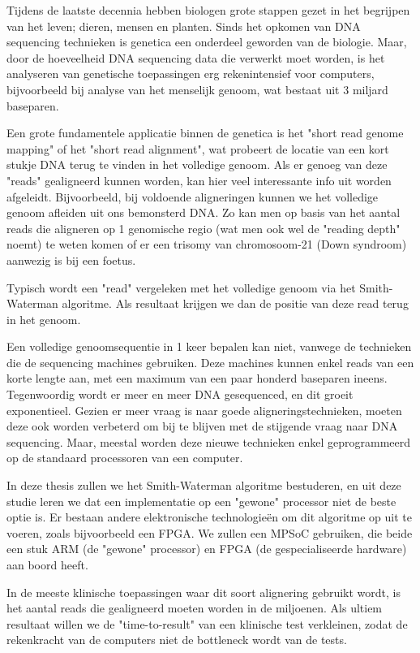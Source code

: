 Tijdens de laatste decennia hebben biologen grote stappen gezet in het begrijpen van het leven; dieren, mensen en planten. Sinds het opkomen van DNA sequencing technieken is genetica een onderdeel geworden van de biologie. Maar, door de hoeveelheid DNA sequencing data die verwerkt moet worden, is het analyseren van genetische toepassingen erg rekenintensief voor computers, bijvoorbeeld bij analyse van het menselijk genoom, wat bestaat uit 3 miljard baseparen.

Een grote fundamentele applicatie binnen de genetica is het "short read genome mapping" of het "short read alignment", wat probeert de locatie van een kort stukje DNA terug te vinden in het volledige genoom. Als er genoeg van deze "reads" gealigneerd kunnen worden, kan hier veel interessante info uit worden afgeleidt. Bijvoorbeeld, bij voldoende aligneringen kunnen we het volledige genoom afleiden uit ons bemonsterd DNA. Zo kan men op basis van het aantal reads die aligneren op 1 genomische regio (wat men ook wel de "reading depth" noemt) te weten komen of er een trisomy van chromosoom-21 (Down syndroom) aanwezig is bij een foetus.

Typisch wordt een "read" vergeleken met het volledige genoom via het Smith-Waterman algoritme. Als resultaat krijgen we dan de positie van deze read terug in het genoom.

Een volledige genoomsequentie in 1 keer bepalen kan niet, vanwege de technieken die de sequencing machines gebruiken. Deze machines kunnen enkel reads van een korte lengte aan, met een maximum van een paar honderd baseparen ineens. Tegenwoordig wordt er meer en meer DNA gesequenced, en dit groeit exponentieel. Gezien er meer vraag is naar goede aligneringstechnieken, moeten deze ook worden verbeterd om bij te blijven met de stijgende vraag naar DNA sequencing. Maar, meestal worden deze nieuwe technieken enkel geprogrammeerd op de standaard processoren van een computer.

In deze thesis zullen we het Smith-Waterman algoritme bestuderen, en uit deze studie leren we dat een implementatie op een "gewone" processor niet de beste optie is. Er bestaan andere elektronische technologie\"en om dit algoritme op uit te voeren, zoals bijvoorbeeld een FPGA. We zullen een MPSoC gebruiken, die beide een stuk ARM (de "gewone" processor) en FPGA (de gespecialiseerde hardware) aan boord heeft.

In de meeste klinische toepassingen waar dit soort alignering gebruikt wordt, is het aantal reads die gealigneerd moeten worden in de miljoenen. Als ultiem resultaat willen we de "time-to-result" van een klinische test verkleinen, zodat de rekenkracht van de computers niet de bottleneck wordt van de tests.

